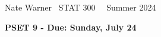 \documentclass{report}
\title{\Huge{}}
\author{\huge{Nathan Warner}}
\date{\huge{}}
\begin{document}
 \pagebreak \bigbreak \noindent
 Nate Warner \ \quad \quad \quad \quad \quad \quad \quad \quad \quad \quad \quad \quad  STAT 300 \quad  \quad \quad \quad \quad \quad \quad \quad \quad \ \ \quad Summer 2024
 \begin{center}
     \textbf{PSET 9 - Due: Sunday, July 24}
 \end{center}
\end{document}
